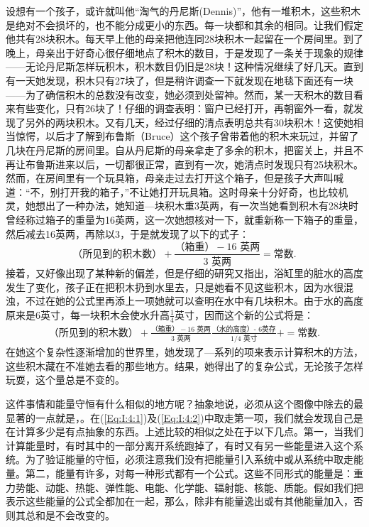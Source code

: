 设想有一个孩子，或许就叫他“淘气的丹尼斯(Dennis)”，他有一堆积木，这些积木是绝对不会损坏的，也不能分成更小的东西。每一块都和其余的相同。让我们假定他共有28块积木。每天早上他的母亲把他连同28块积木一起留在一个房间里。到了晚上，母亲出于好奇心很仔细地点了积木的数目，于是发现了一条关于现象的规律——无论丹尼斯怎样玩积木，积木数目仍旧是28块！这种情况继续了好几天。直到有一天她发现，积木只有27块了，但是稍许调查一下就发现在地毯下面还有一块——为了确信积木的总数没有改变，她必须到处留神。然而，某一天积木的数目看来有些变化，只有26块了！仔细的调查表明：窗户已经打开，再朝窗外一看，就发现了另外的两块积木。又有几天，经过仔细的清点表明总共有30块积木！这使她相当惊愕，以后才了解到布鲁斯（Bruce）这个孩子曾带着他的积木来玩过，并留了几块在丹尼斯的房间里。自从丹尼斯的母亲拿走了多余的积木，把窗关上，并且不再让布鲁斯进来以后，一切都很正常，直到有一次，她清点时发现只有25块积木。然而，在房间里有一个玩具箱，母亲走过去打开这个箱子，但是孩子大声叫喊道：“不，别打开我的箱子，”不让她打开玩具箱。这时母亲十分好奇，也比较机灵，她想出了一种办法，她知道—块积木重3英两，有一次当她看到积木有28块时曾经称过箱子的重量为16英两，这一次她想核对一下，就重新称一下箱子的重量，然后减去16英两，再除以3，于是就发现了以下的式子：
\begin{equation}
    \label{Eq:I:4:1}
    \text{（所见到的积木数）}
    +
    \frac{\text{（箱重）}-\text{$16$ 英两}}{\text{$3$ 英两}}=
    \text{常数}.
\end{equation}
接着，又好像出现了某种新的偏差，但是仔细的研究又指出，浴缸里的脏水的高度发生了变化，孩子正在把积木扔到水里去，只是她看不见这些积木，因为水很混浊，不过在她的公式里再添上一项她就可以查明在水中有几块积木。由于水的高度原来是6英寸，每一块积木会使水升高$\frac{1}{4} $英寸，因而这个新的公式将是：
\begin{align}
    \label{Eq:I:4:2}
    \text{（所见到的积木数）}
    +
    \frac{\text{（箱重）}-\text{$16$ 英两}}{\text{$3$ 英两}}
    \frac{\text{（水的高度）- $6$英存}}{\text{$1/4$ 英寸}}+
    =
    \text{常数}.
\end{align}
在她这个复杂性逐渐增加的世界里，她发现了—系列的项来表示计算积木的方法，这些积木藏在不准她去看的那些地方。结果，她得出了的复杂公式，无论孩子怎样玩耍，这个量总是不变的。

这件事情和能量守恒有什么相似的地方呢？抽象地说，必须从这个图像中除去的最显著的一点就是，。在(\ref{Eq:I:4:1})及(\ref{Eq:I:4:2})中取走第一项，我们就会发现自己是在计算多少是有点抽象的东西。上述比较的相似之处在于以下几点。第一，当我们计算能量时，有时其中的一部分离开系统跑掉了，有时又有另一些能量进入这个系统。为了验证能量的守恒，必须注意我们没有把能量引入系统中或从系统中取走能量。第二，能量有许多，对每一种形式都有一个公式。这些不同形式的能量是：重力势能、动能、热能、弹性能、电能、化学能、辐射能、核能、质能。假如我们把表示这些能量的公式全都加在一起，那么，除非有能量逸出或有其他能量加入，否则其总和是不会改变的。

